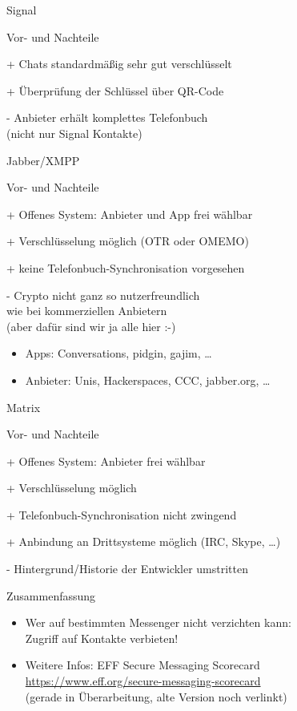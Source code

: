 \begin{frame}{Signal}
\begin{blex}{Vor- und Nachteile}
\item[+] Chats standardmäßig sehr gut verschlüsselt
\item[+] Überprüfung der Schlüssel über QR-Code
\item[-] Anbieter erhält komplettes Telefonbuch\\ (nicht nur Signal Kontakte)
\end{blex}
\end{frame}

\begin{frame}{Jabber/XMPP}
\begin{blex}{Vor- und Nachteile}
\item[+] Offenes System: Anbieter und App frei wählbar
\item[+] Verschlüsselung möglich (OTR oder OMEMO)
\item[+] keine Telefonbuch-Synchronisation vorgesehen
\item[-] Crypto nicht ganz so nutzerfreundlich\\wie bei kommerziellen Anbietern\\(aber dafür sind wir ja alle hier :-)
\end{blex}
\begin{itemize}
  \item    Apps: Conversations, pidgin, gajim, \ldots
  \item    Anbieter: Unis, Hackerspaces, CCC, jabber.org, \ldots
\end{itemize}
\end{frame}

\begin{frame}{Matrix}
\begin{blex}{Vor- und Nachteile}
\item[+] Offenes System: Anbieter frei wählbar
\item[+] Verschlüsselung möglich
\item[+] Telefonbuch-Synchronisation nicht zwingend
\item[+] Anbindung an Drittsysteme möglich (IRC, Skype, \ldots)
\item[-] Hintergrund/Historie der Entwickler umstritten
\end{blex}
\end{frame}

\begin{frame}{Zusammenfassung}
  \begin{itemize}
    \item Wer auf bestimmten Messenger nicht verzichten kann:\\Zugriff auf Kontakte verbieten!
    \item Weitere Infos: EFF Secure Messaging Scorecard\\ {\url{https://www.eff.org/secure-messaging-scorecard}}\\
      (gerade in Überarbeitung, alte Version noch verlinkt)
  \end{itemize}
\end{frame}

